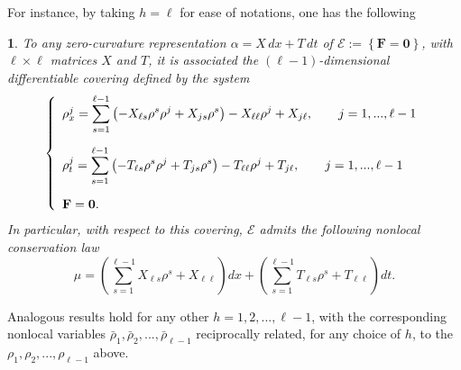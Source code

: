 \documentclass[12pt,english]{elsarticle}
\theoremstyle{plain}
\theoremstyle{plain}
\newtheorem{prop}[thm]{\protect\propositionname}
\theoremstyle{remark}
\theoremstyle{plain}
\theoremstyle{definition}
\theoremstyle{definition}
\providecommand{\propositionname}{Proposition}
\begin{document}
For instance, by taking $h=\ell $ for ease of notations, one has the following
%
\begin{prop}
\label{ZCR-Riccati_NLCL}%
To any zero-curvature representation $\alpha =X\,dx+T\,dt$ of
$\mathcal{E}:=\left \{ \mathbf{F=0}\right \} $, with
$\ell \times \ell $ matrices $X$ and $T$, it is associated the
$(\ell -1)$-dimensional differentiable covering defined by the system
%
\begin{equation*}
\left \{
%
\begin{array}{l}
\rho _{x}^{j}={\displaystyle \sum _{s=1}^{\ell -1}\left (-X_{\ell s}
\rho ^{s}\rho ^{j}+X_{js}\rho ^{s}\right )-X_{\ell \ell}\rho ^{j}+X_{j
\ell},\qquad j=1,...,\ell -1}
\vspace{10pt}
\\
\rho _{t}^{j}={\displaystyle \sum _{s=1}^{\ell -1}\left (-T_{\ell s}
\rho ^{s}\rho ^{j}+T_{js}\rho ^{s}\right )-T_{\ell \ell}\rho ^{j}+T_{j
\ell},\qquad j=1,...,\ell -1}
\vspace{10pt}
\\
\mathbf{F=0}.
\end{array}
%
\right .
\end{equation*}
%
In particular, with respect to this covering, $\mathcal{E}$ admits the
following nonlocal conservation law
%
\begin{equation*}
\mu =\left (\sum _{s=1}^{\ell -1}X_{\ell s}\rho ^{s}+X_{\ell \ell}
\right )dx+\left (\sum _{s=1}^{\ell -1}T_{\ell s}\rho ^{s}+T_{\ell
\ell}\right )dt.
\end{equation*}
%
\end{prop}

  Analogous results hold for any other $h=1,2,...,\ell -1$, with the corresponding
nonlocal variables
$\bar{\rho}_{1},\bar{\rho}_{2},...,\bar{\rho}_{\ell -1}$ reciprocally related,
for any choice of $h$, to the
$\rho _{1},\rho _{2},...,\rho _{\ell -1}$ above.
\end{document}
